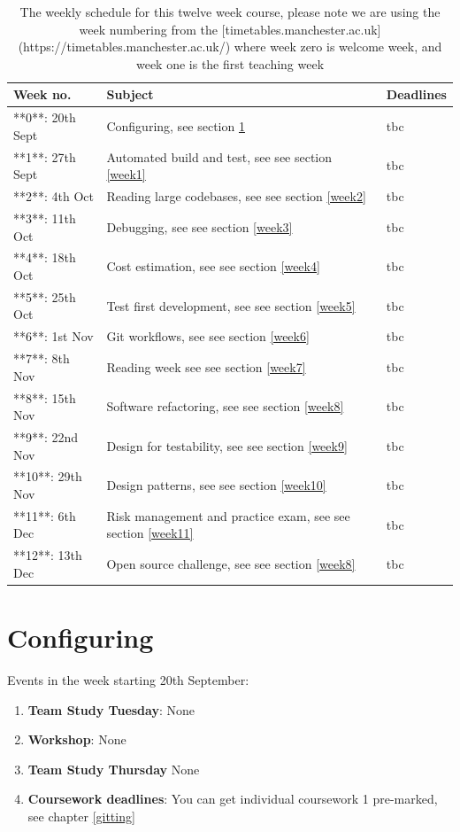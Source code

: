 \documentclass[
]{book}
\providecommand{\tightlist}{%
  \setlength{\itemsep}{0pt}\setlength{\parskip}{0pt}}
\begin{document}
\begin{table}

\caption{\label{tab:schedtable}The weekly schedule for this twelve week course, please note we are using the week numbering from the [timetables.manchester.ac.uk](https://timetables.manchester.ac.uk/) where week zero is welcome week, and week one is the first teaching week}
\centering
\begin{tabular}[t]{lll}
\toprule
Week no. & Subject & Deadlines\\
\midrule
**0**: 20th Sept & Configuring, see section \ref{week0} & tbc\\
**1**: 27th Sept & Automated build and test, see see section \ref{week1} & tbc\\
**2**: 4th Oct & Reading large codebases, see see section \ref{week2} & tbc\\
**3**: 11th Oct & Debugging, see see section \ref{week3} & tbc\\
**4**: 18th Oct & Cost estimation, see see section \ref{week4} & tbc\\
\addlinespace
**5**: 25th Oct & Test first development, see see section \ref{week5} & tbc\\
**6**: 1st Nov & Git workflows, see see section \ref{week6} & tbc\\
**7**: 8th Nov & Reading week see see section \ref{week7} & tbc\\
**8**: 15th Nov & Software refactoring, see see section \ref{week8} & tbc\\
**9**: 22nd Nov & Design for testability, see see section \ref{week9} & tbc\\
\addlinespace
**10**: 29th Nov & Design patterns, see see section \ref{week10} & tbc\\
**11**: 6th Dec & Risk management and practice exam, see see section \ref{week11} & tbc\\
**12**: 13th Dec & Open source challenge, see see section \ref{week8} & tbc\\
\bottomrule
\end{tabular}
\end{table}

\hypertarget{week0}{%
\section{Configuring}\label{week0}}

Events in the week starting 20th September:

\begin{enumerate}
\def\labelenumi{\arabic{enumi}.}
\tightlist
\item
  \textbf{Team Study Tuesday}: None
\item
  \textbf{Workshop}: None
\item
  \textbf{Team Study Thursday} None
\item
  \textbf{Coursework deadlines}: You can get individual coursework 1 pre-marked, see chapter \ref{gitting}
\end{enumerate}
\end{document}
